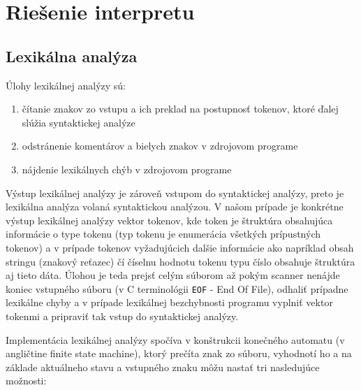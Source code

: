 \documentclass[12pt,a4paper,titlepage,final]{article}
\begin{document}
\pagestyle{plain}
\setcounter{page}{1}
\tableofcontents

\newpage
\pagestyle{plain}
\setcounter{page}{1}


\section{Riešenie interpretu} \label{Riesenie interpretu}

\subsection{Lexikálna analýza}
Úlohy lexikálnej analýzy sú:
\begin{enumerate}
    \itemsep0em
    \item čítanie znakov zo vstupu a ich preklad na postupnosť tokenov, ktoré ďalej slúžia syntaktickej analýze
    \item odstránenie komentárov a bielych znakov v zdrojovom programe
    \item nájdenie lexikálnych chýb v zdrojovom programe
\end{enumerate}

Výstup lexikálnej analýzy je zároveň vstupom do syntaktickej analýzy, preto je
lexikálna analýza volaná syntaktickou analýzou. V našom prípade je konkrétne
výstup lexikálnej analýzy vektor tokenov, kde token je štruktúra obsahujúca
informácie o type tokenu (typ tokenu je enumerácia všetkých prípustných tokenov)
a v prípade tokenov vyžadujúcich dalšie informácie ako napríklad obsah stringu
(znakový reťazec) čí číselnu hodnotu tokenu typu číslo obsahuje štruktúra aj tieto dáta.
Úlohou je teda prejsť celým súborom až pokým scanner nenájde koniec vstupného súboru
(v C terminológii \texttt{EOF} - End Of File), odhaliť prípadne lexikálne chyby a
v prípade lexikálnej bezchybnosti programu vyplniť vektor tokenmi a pripraviť
tak vstup do syntaktickej analýzy.

Implementácia lexikálnej analýzy spočíva v konštrukcii konečného automatu
(v angličtine finite state machine), ktorý prečíta znak zo súboru, vyhodnotí
ho a na základe aktuálneho stavu a vstupného znaku môžu nastať tri nasledujúce
 možnosti:
\end{document}
